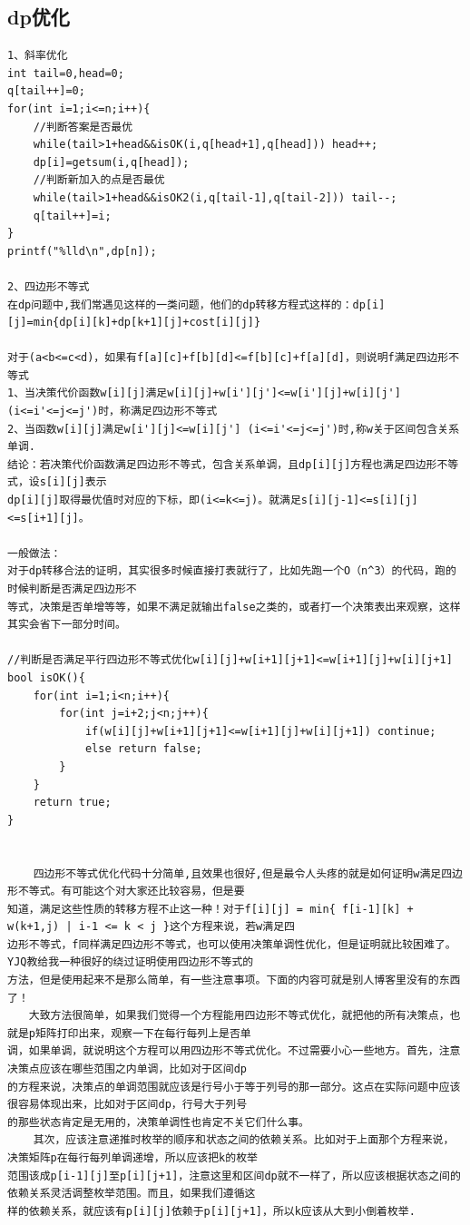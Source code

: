 \documentclass[twoside]{article}
\begin{document}
\subsection{dp优化}
\begin{lstlisting}
1、斜率优化
int tail=0,head=0;
q[tail++]=0;
for(int i=1;i<=n;i++){
    //判断答案是否最优
    while(tail>1+head&&isOK(i,q[head+1],q[head])) head++;
    dp[i]=getsum(i,q[head]);
    //判断新加入的点是否最优
    while(tail>1+head&&isOK2(i,q[tail-1],q[tail-2])) tail--;
    q[tail++]=i;
}
printf("%lld\n",dp[n]);

2、四边形不等式
在dp问题中,我们常遇见这样的一类问题，他们的dp转移方程式这样的：dp[i][j]=min{dp[i][k]+dp[k+1][j]+cost[i][j]}

对于(a<b<=c<d)，如果有f[a][c]+f[b][d]<=f[b][c]+f[a][d]，则说明f满足四边形不等式
1、当决策代价函数w[i][j]满足w[i][j]+w[i'][j']<=w[i'][j]+w[i][j'] (i<=i'<=j<=j')时，称满足四边形不等式
2、当函数w[i][j]满足w[i'][j]<=w[i][j'] (i<=i'<=j<=j')时,称w关于区间包含关系单调.
结论：若决策代价函数满足四边形不等式，包含关系单调，且dp[i][j]方程也满足四边形不等式，设s[i][j]表示
dp[i][j]取得最优值时对应的下标，即(i<=k<=j)。就满足s[i][j-1]<=s[i][j]<=s[i+1][j]。

一般做法：
对于dp转移合法的证明，其实很多时候直接打表就行了，比如先跑一个O（n^3）的代码，跑的时候判断是否满足四边形不
等式，决策是否单增等等，如果不满足就输出false之类的，或者打一个决策表出来观察，这样其实会省下一部分时间。

//判断是否满足平行四边形不等式优化w[i][j]+w[i+1][j+1]<=w[i+1][j]+w[i][j+1]
bool isOK(){
    for(int i=1;i<n;i++){
        for(int j=i+2;j<n;j++){
            if(w[i][j]+w[i+1][j+1]<=w[i+1][j]+w[i][j+1]) continue;
            else return false;
        }
    }
    return true;
}


    四边形不等式优化代码十分简单,且效果也很好,但是最令人头疼的就是如何证明w满足四边形不等式。有可能这个对大家还比较容易，但是要
知道，满足这些性质的转移方程不止这一种！对于f[i][j] = min{ f[i-1][k] + w(k+1,j) | i-1 <= k < j }这个方程来说，若w满足四
边形不等式，f同样满足四边形不等式，也可以使用决策单调性优化，但是证明就比较困难了。YJQ教给我一种很好的绕过证明使用四边形不等式的
方法，但是使用起来不是那么简单，有一些注意事项。下面的内容可就是别人博客里没有的东西了！
　　大致方法很简单，如果我们觉得一个方程能用四边形不等式优化，就把他的所有决策点，也就是p矩阵打印出来，观察一下在每行每列上是否单
调，如果单调，就说明这个方程可以用四边形不等式优化。不过需要小心一些地方。首先，注意决策点应该在哪些范围之内单调，比如对于区间dp
的方程来说，决策点的单调范围就应该是行号小于等于列号的那一部分。这点在实际问题中应该很容易体现出来，比如对于区间dp，行号大于列号
的那些状态肯定是无用的，决策单调性也肯定不关它们什么事。
    其次，应该注意递推时枚举的顺序和状态之间的依赖关系。比如对于上面那个方程来说，决策矩阵p在每行每列单调递增，所以应该把k的枚举
范围该成p[i-1][j]至p[i][j+1]，注意这里和区间dp就不一样了，所以应该根据状态之间的依赖关系灵活调整枚举范围。而且，如果我们遵循这
样的依赖关系，就应该有p[i][j]依赖于p[i][j+1]，所以k应该从大到小倒着枚举.\end{lstlisting}
\end{document}
